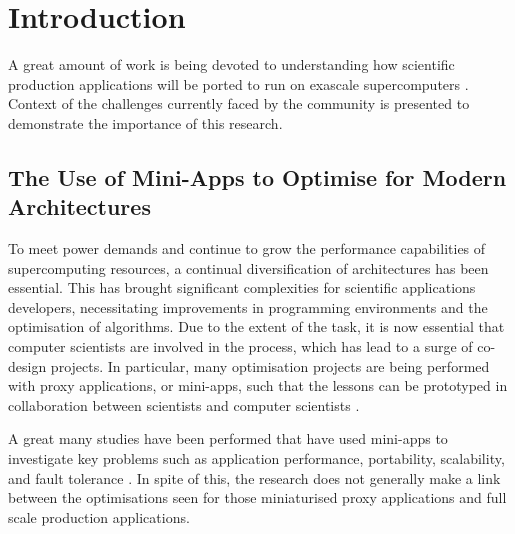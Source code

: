 \documentclass[runningheads,a4paper]{llncs}
\begin{document}
\section{Introduction}

A great amount of work is being devoted to understanding how scientific production applications will be ported to run on exascale supercomputers \cite{Kogge2013}. Context of the challenges currently faced by the community is presented to demonstrate the importance of this research. 

\subsection{The Use of Mini-Apps to Optimise for Modern Architectures}

To meet power demands and continue to grow the performance capabilities of supercomputing resources, a continual diversification of architectures has been essential. This has brought significant complexities for scientific applications developers, necessitating improvements in programming environments and the optimisation of algorithms. Due to the extent of the task, it is now essential that computer scientists are involved in the process, which has lead to a surge of co-design projects. In particular, many optimisation projects are being performed with proxy applications, or mini-apps, such that the lessons can be prototyped in collaboration between scientists and computer scientists \cite{Mantevo}.

A great many studies have been performed that have used mini-apps to investigate key problems such as application performance, portability, scalability, and fault tolerance \cite{Hart2015} \cite{Bercea2015} \cite{Martineau2016}. In spite of this, the research does not generally make a link between the optimisations seen for those miniaturised proxy applications and full scale production applications.

\end{document}
